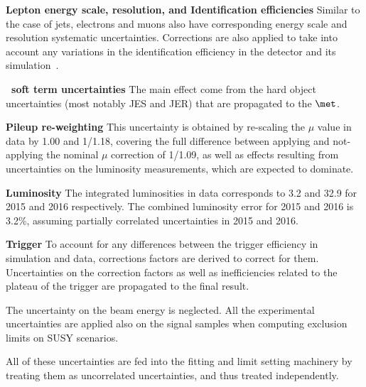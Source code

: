 \textbf{Lepton energy scale, resolution, and Identification efficiencies}
Similar to the case of jets, electrons and muons also have corresponding 
energy scale and resolution systematic uncertainties. Corrections are 
also applied to take into account any variations in the identification 
efficiency in the detector and its simulation~\cite{ATLAS-CONF-2016-024,Aad:2016jkr,ATLAS-CONF-2016-024}.

\textbf{\met\ soft term uncertainties}
The main effect come from the hard object uncertainties (most notably JES and 
JER) that are propagated to the $\met$.

\textbf{Pileup re-weighting}
This uncertainty is obtained by re-scaling the $\mu$ value in data by 1.00 and 1/1.18, 
covering the full difference between applying and not-applying the nominal $\mu$ correction of 1/1.09, 
as well as effects resulting from uncertainties on the luminosity measurements, which are expected to dominate.

\textbf{Luminosity}
The integrated luminosities in data corresponds to 3.2 \ifb and 32.9 \ifb 
for 2015 and 2016 respectively. The combined luminosity error for 2015 and 2016 is 3.2\%, assuming partially correlated uncertainties in 2015 and 2016.


\textbf{Trigger}
To account for any differences between the trigger efficiency in simulation 
and data, corrections factors are derived to correct for them. 
Uncertainties on the correction factors as well as inefficiencies 
related to the plateau of the trigger are propagated to the final result.

The uncertainty on the beam energy is neglected. 
All the experimental uncertainties are applied also on the signal samples when computing exclusion limits on SUSY scenarios. 


All of these uncertainties are fed into the fitting and limit setting 
machinery by treating them as uncorrelated uncertainties, and thus 
treated independently. 
